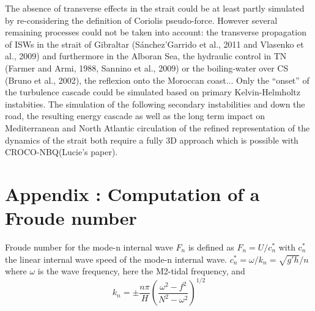 \documentclass[a4paper,12pt]{article}
\begin{document}
 The absence of transverse effects in the strait could be at least partly simulated by re-considering the definition of Coriolis pseudo-force. However several remaining processes could not be taken into account: the transverse propagation of ISWs in the strait of Gibraltar (S\'anchez'Garrido et al., 2011 and Vlasenko et al., 2009) and furthermore in the Alboran Sea, the hydraulic control in TN (Farmer and Armi, 1988, Sannino et al., 2009) or the boiling-water over CS (Bruno et al., 2002), the reflexion onto the Moroccan coast... Only the ``onset'' of the turbulence cascade could be simulated based on primary Kelvin-Helmholtz instabities. The simulation of the following secondary instabilities and down the road, the resulting energy cascade as well as the long term impact on Mediterranean and North Atlantic circulation of the refined representation of the dynamics of the strait both require a fully 3D approach which is possible with CROCO-NBQ\color{red}(Lucie's paper)\color{black}. 
 


 \color{black}

\clearpage
\section{Appendix : Computation of a Froude number}
Froude number for the mode-n internal wave $F_n$ is defined as $F_n=U/c^*_n$ with c$^*_n$ the linear internal wave speed of the mode-n internal wave.
 $c^*_n=\omega / k_n = \sqrt{g'h}/n$
 where $\omega$ is the wave frequency, here the M2-tidal frequency, and 
\begin{equation}
\label{eqK}
k_n=\pm \frac{n \pi}{H} \left( \frac{\omega^2 - f^2}{N^2 - \omega^2} \right) ^{1/2} 
\end{equation}
\end{document}
